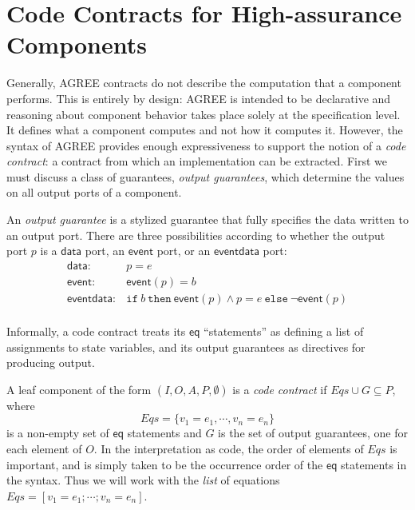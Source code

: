 \documentclass[global,twocolumn]{svjour}
\newcommand{\konst}[1]{\ensuremath{\mathsf{#1}}}
\newcommand{\set}[1]{\ensuremath{\{ {#1} \}}}
\newcommand{\itelse}[3]{\mbox{$\mathtt{if}\ {#1}\ \mathtt{then}\ {#2}\ \mathtt{else}\ {#3}$}}
\begin{document}
\section{Code Contracts for High-assurance Components}
\label{sec:code-contracts}

Generally, AGREE contracts do not describe the computation that a component performs.
%
This is entirely by design: AGREE is intended to be declarative and reasoning about component behavior takes place solely at the specification level.
%
It defines what a component computes and not how it computes it.
%
However, the syntax of AGREE provides enough expressiveness to support the notion of a \emph{code contract}: a contract from which an implementation can be extracted.
%
First we must discuss a class of guarantees, \emph{output guarantees}, which determine the values on all output ports of a component.

\begin{definition}
An \emph{output guarantee} is a stylized guarantee that fully specifies the data written to an output port.
%
There are three possibilities according to whether the output port $p$ is a \konst{data} port, an \konst{event} port, or an \konst{event data} port:
%
\[
\begin{array}{ll}
\konst{data}: &  p = \mathit{e} \\
\konst{event}: &  \konst{event} (p) = \mathit{b} \\
\konst{event data}: & \itelse{b}{\konst{event} (p) \land p = e}{\neg \konst{event}(p)} \\
\end{array}
\]
%
\end{definition}

Informally, a code contract treats its \konst{eq} ``statements'' as defining a list of assignments to state variables, and its output guarantees as directives for producing output.

\begin{definition}
A leaf component of the form $(I,O,A,P,\emptyset)$ is a \emph{code contract} if $\mathit{Eqs} \cup G \subseteq P$, where \[\mathit{Eqs} = \set{v_1 = e_1, \cdots , v_n = e_n} \] is a non-empty set of \konst{eq} statements and $G$ is the set of output guarantees, one for each element of $O$.
%
In the interpretation as code, the order of elements of $\mathit{Eqs}$ is important, and is simply taken to be the occurrence order of the \konst{eq} statements in the syntax.
%
Thus we will work with the \emph{list} of equations $\mathit{Eqs} = [v_1 = e_1; \cdots ; v_n = e_n]$.
\end{definition}
\end{document}
